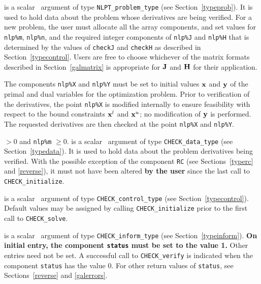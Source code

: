 \documentclass{galahad}
\newcommand{\packagename}{CHECK}
\begin{document}
\vspace*{-2mm}
\begin{description}
 is a scalar \intentinout\ argument of type 
{\tt NLPT\_problem\_type}
(see Section~\ref{typeprob}). 
It is used to hold data about the problem whose derivatives are being verified.
For a new problem, the user must allocate all the array components,
and set values for {\tt nlp\%m}, {\tt nlp\%n},
and the required integer components of {\tt nlp\%J} and {\tt nlp\%H}
that is determined by the values of {\tt checkJ} and {\tt checkH} as described in Section~\ref{typecontrol}.  
Users are free to choose whichever
of the matrix formats described in Section~\ref{galmatrix} 
is appropriate for ${\mathbf{J}}$ and ${\mathbf{H}}$ for their application.

\noindent
The components {\tt nlp\%X} and {\tt nlp\%Y} must be set to initial
values ${\mathbf{x}}$ and ${\mathbf{y}}$ of the primal and dual variables for the
optimization problem.  Prior to verification of the derivatives, the point {\tt nlp\%X} is modified
internally to ensure feasibility with respect to the bound constraints
${\mathbf{x}}^l$ and ${\mathbf{x}}^u$; no modification of ${\mathbf{y}}$ is performed.  The
requested derivatives are then checked at the point {\tt nlp\%X} and {\tt nlp\%Y}.

\noindent
{} $> 0$ and {\tt nlp\%m} $\geq 0$.
 is a scalar \intentinout\ argument of type 
{\tt \packagename\_data\_type}
(see Section~\ref{typedata}). It is used to hold data about the
problem derivatives being verified.  With the possible exception of the component 
{\tt RC} (see Sections~\ref{typerc} and \ref{reverse}), 
it must not have been altered {\bf by the user} since the last call to 
{\tt \packagename\_initialize}.

 is a scalar \intentin\ argument of type 
{\tt \packagename\_control\_type}
(see Section~\ref{typecontrol}). Default values may be assigned by calling 
{\tt \packagename\_initialize} prior to the first call to 
{\tt \packagename\_solve}.

 is a scalar \intentinout\ argument of type 
{\tt \packagename\_inform\_type}
(see Section~\ref{typeinform}). 
{\bf On initial entry, the  component {\tt status} must be set to the value 1.} 
Other entries need not be set.
A successful call to
{\tt \packagename\_verify}
is indicated when the  component {\tt status} has the value 0. 
For other return values of {\tt status}, see Sections~\ref{reverse} and
\ref{galerrors}.


\end{description}
\end{document}
